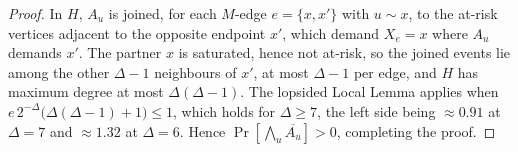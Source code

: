 \documentclass[10pt,a4paper]{amsart}
\begin{document}
\begin{proof}
\medskip\noindent
In $H$, $A_u$ is joined, for each $M$-edge $e = \{x,x'\}$ with
$u \sim x$, to the at-risk vertices adjacent to the opposite endpoint $x'$, which
demand $X_e = x$ where $A_u$ demands $x'$. The partner $x$ is saturated, hence
not at-risk, so the joined events lie among the other $\Delta - 1$ neighbours of
$x'$, at most $\Delta - 1$ per edge, and $H$
has maximum degree at most $\Delta(\Delta-1)$. The lopsided
Local Lemma applies when $e\,2^{-\Delta}\bigl(\Delta(\Delta-1)+1\bigr) \le 1$,
which holds for $\Delta \ge 7$, the left side being $\approx 0.91$ at
$\Delta = 7$ and $\approx 1.32$ at $\Delta = 6$. Hence
$\Pr[\bigwedge_u \overline{A_u}] > 0$, completing the proof.
\end{proof}
\end{document}
